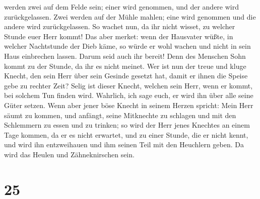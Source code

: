 werden zwei auf dem Felde sein; einer wird genommen, und der andere wird
zurückgelassen.  Zwei werden auf der Mühle mahlen; eine
wird genommen und die andere wird zurückgelassen.  So
wachet nun, da ihr nicht wisset, zu welcher Stunde euer Herr kommt!
 Das aber merket: wenn der Hausvater wüßte, in welcher
Nachtstunde der Dieb käme, so würde er wohl wachen und nicht in sein
Haus einbrechen lassen.  Darum seid auch ihr bereit! Denn
des Menschen Sohn kommt zu der Stunde, da ihr es nicht meinet.
 Wer ist nun der treue und kluge Knecht, den sein Herr
über sein Gesinde gesetzt hat, damit er ihnen die Speise gebe zu rechter
Zeit?  Selig ist dieser Knecht, welchen sein Herr, wenn
er kommt, bei solchem Tun finden wird.  Wahrlich, ich
sage euch, er wird ihn über alle seine Güter setzen. 
Wenn aber jener böse Knecht in seinem Herzen spricht: Mein Herr säumt zu
kommen,  und anfängt, seine Mitknechte zu schlagen und
mit den Schlemmern zu essen und zu trinken;  so wird der
Herr jenes Knechtes an einem Tage kommen, da er es nicht erwartet, und
zu einer Stunde, die er nicht kennt,  und wird ihn
entzweihauen und ihm seinen Teil mit den Heuchlern geben. Da wird das
Heulen und Zähneknirschen sein.

\hypertarget{section-24}{%
\section{25}\label{section-24}}

